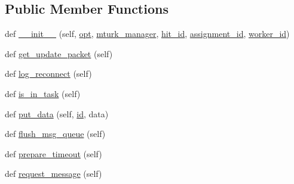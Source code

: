 \subsection*{Public Member Functions}
\begin{DoxyCompactItemize}
\item 
def \hyperlink{classparlai_1_1mturk_1_1webapp_1_1run__mocks_1_1mock__turk__agent_1_1MockTurkAgent_a99bfa776d86b818326766f6acf283790}{\+\_\+\+\_\+init\+\_\+\+\_\+} (self, \hyperlink{classparlai_1_1core_1_1agents_1_1Agent_ab3b45d2754244608c75d4068b90cd051}{opt}, \hyperlink{classparlai_1_1mturk_1_1core_1_1agents_1_1MTurkAgent_ae3fddc0185f75ea64b09a86628d4a1d1}{mturk\+\_\+manager}, \hyperlink{classparlai_1_1mturk_1_1core_1_1agents_1_1MTurkAgent_a4325d1370d25335d4a7ad279d7d0c615}{hit\+\_\+id}, \hyperlink{classparlai_1_1mturk_1_1core_1_1agents_1_1MTurkAgent_ada9c2a6ca3ee222f73743b2bc3a9d85f}{assignment\+\_\+id}, \hyperlink{classparlai_1_1mturk_1_1core_1_1agents_1_1MTurkAgent_a88699f19c4c7e658ae0424062cbb9d80}{worker\+\_\+id})
\item 
def \hyperlink{classparlai_1_1mturk_1_1webapp_1_1run__mocks_1_1mock__turk__agent_1_1MockTurkAgent_aba5ee0abf70303d9711516a1b2e02af5}{get\+\_\+update\+\_\+packet} (self)
\item 
def \hyperlink{classparlai_1_1mturk_1_1webapp_1_1run__mocks_1_1mock__turk__agent_1_1MockTurkAgent_a78e4c3fdd5d6ddf0d01d9b2cb57d7ef9}{log\+\_\+reconnect} (self)
\item 
def \hyperlink{classparlai_1_1mturk_1_1webapp_1_1run__mocks_1_1mock__turk__agent_1_1MockTurkAgent_aafcf8fb590eb73fbd5bafa4122a56604}{is\+\_\+in\+\_\+task} (self)
\item 
def \hyperlink{classparlai_1_1mturk_1_1webapp_1_1run__mocks_1_1mock__turk__agent_1_1MockTurkAgent_aa806b7a548bf73387b603edc23229afc}{put\+\_\+data} (self, \hyperlink{classparlai_1_1mturk_1_1webapp_1_1run__mocks_1_1mock__turk__agent_1_1MockTurkAgent_a1a099ffc00a93cdf9e8bd4b559737951}{id}, data)
\item 
def \hyperlink{classparlai_1_1mturk_1_1webapp_1_1run__mocks_1_1mock__turk__agent_1_1MockTurkAgent_aff1194220b1656a156e3428d0ae7e09d}{flush\+\_\+msg\+\_\+queue} (self)
\item 
def \hyperlink{classparlai_1_1mturk_1_1webapp_1_1run__mocks_1_1mock__turk__agent_1_1MockTurkAgent_a30989dcb772a11368d64a9d8994e4439}{prepare\+\_\+timeout} (self)
\item 
def \hyperlink{classparlai_1_1mturk_1_1webapp_1_1run__mocks_1_1mock__turk__agent_1_1MockTurkAgent_a37c6234e8bf0f607732dacbdabf899d9}{request\+\_\+message} (self)

\end{DoxyCompactItemize}
